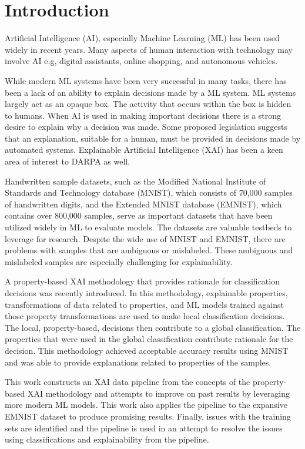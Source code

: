 \documentclass[conference]{IEEEtran}
\begin{document}
\section{Introduction}
Artificial Intelligence (AI), especially Machine Learning (ML) has been used
widely in recent years.  Many aspects of human interaction with technology may
involve AI e.g, digital assistants, online shopping, and autonomous vehicles.

While modern ML systems have been very successful in many tasks, there has been
a lack of an ability to explain decisions made by a ML system. ML systems
largely act as an opaque box.  The activity that occurs within the box is hidden
to humans.  When AI is used in making important decisions there is a strong
desire to explain why a decision was made.  Some proposed legislation suggests
that an explanation, suitable for a human, must be provided in decisions made
by automated systems.  Explainable Artificial Intelligence (XAI) has been a keen
area of interest to DARPA\cite{Gunning_Aha_2019} as well.

Handwritten sample datasets, such as the Modified National Institute of
Standards and Technology database (MNIST)\cite{deng2012mnist}, which consists of
70,000 samples of handwritten digits, and the Extended MNIST database\cite{cohen2017emnist}
(EMNIST), which contains over 800,000 samples, serve as
important datasets that have been utilized widely in ML to evaluate models. The
datasets are valuable testbeds to leverage for research. Despite the wide use of
MNIST and EMNIST, there are problems with samples that are ambiguous or
mislabeled.  These ambiguous and mislabeled samples are especially challenging
for explainability.

A property-based XAI methodology\cite{whitten21} that provides rationale for
classification decisions was recently introduced.  In this methodology,
explainable properties, transformations of data related to properties, and ML
models trained against those property transformations are used to make local
classification decisions.  The local, property-based, decisions then contribute
to a global classification.  The properties that were used in the global
classification contribute rationale for the decision.  This methodology achieved
acceptable accuracy results using MNIST and was able to provide explanations
related to properties of the samples.

This work constructs an XAI data pipeline from the concepts of the
property-based XAI methodology and attempts to improve on past results by
leveraging more modern ML models.  This work also applies the pipeline to the
expansive EMNIST dataset to produce promising results.  Finally, issues with the
training sets are identified and the pipeline is used in an attempt to resolve
the issues using classifications and explainability from the pipeline.
\end{document}
